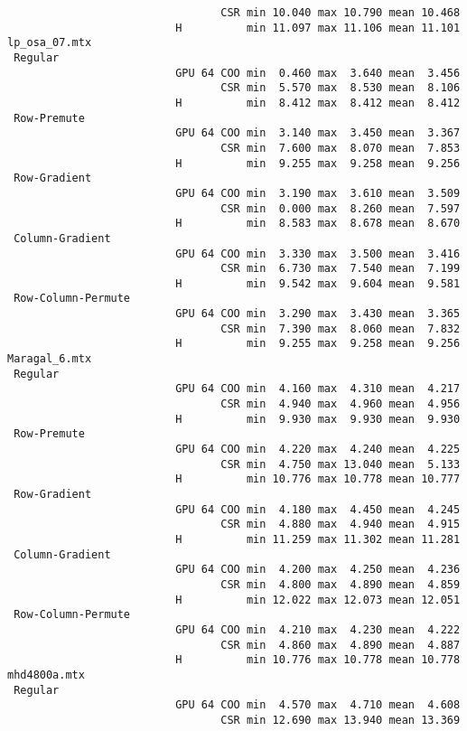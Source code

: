 {\begin{verbatim}
                                 CSR min 10.040 max 10.790 mean 10.468
                          H          min 11.097 max 11.106 mean 11.101
lp_osa_07.mtx
 Regular
                          GPU 64 COO min  0.460 max  3.640 mean  3.456
                                 CSR min  5.570 max  8.530 mean  8.106
                          H          min  8.412 max  8.412 mean  8.412
 Row-Premute
                          GPU 64 COO min  3.140 max  3.450 mean  3.367
                                 CSR min  7.600 max  8.070 mean  7.853
                          H          min  9.255 max  9.258 mean  9.256
 Row-Gradient
                          GPU 64 COO min  3.190 max  3.610 mean  3.509
                                 CSR min  0.000 max  8.260 mean  7.597
                          H          min  8.583 max  8.678 mean  8.670
 Column-Gradient
                          GPU 64 COO min  3.330 max  3.500 mean  3.416
                                 CSR min  6.730 max  7.540 mean  7.199
                          H          min  9.542 max  9.604 mean  9.581
 Row-Column-Permute
                          GPU 64 COO min  3.290 max  3.430 mean  3.365
                                 CSR min  7.390 max  8.060 mean  7.832
                          H          min  9.255 max  9.258 mean  9.256
Maragal_6.mtx
 Regular
                          GPU 64 COO min  4.160 max  4.310 mean  4.217
                                 CSR min  4.940 max  4.960 mean  4.956
                          H          min  9.930 max  9.930 mean  9.930
 Row-Premute
                          GPU 64 COO min  4.220 max  4.240 mean  4.225
                                 CSR min  4.750 max 13.040 mean  5.133
                          H          min 10.776 max 10.778 mean 10.777
 Row-Gradient
                          GPU 64 COO min  4.180 max  4.450 mean  4.245
                                 CSR min  4.880 max  4.940 mean  4.915
                          H          min 11.259 max 11.302 mean 11.281
 Column-Gradient
                          GPU 64 COO min  4.200 max  4.250 mean  4.236
                                 CSR min  4.800 max  4.890 mean  4.859
                          H          min 12.022 max 12.073 mean 12.051
 Row-Column-Permute
                          GPU 64 COO min  4.210 max  4.230 mean  4.222
                                 CSR min  4.860 max  4.890 mean  4.887
                          H          min 10.776 max 10.778 mean 10.778
mhd4800a.mtx
 Regular
                          GPU 64 COO min  4.570 max  4.710 mean  4.608
                                 CSR min 12.690 max 13.940 mean 13.369

\end{verbatim}}

